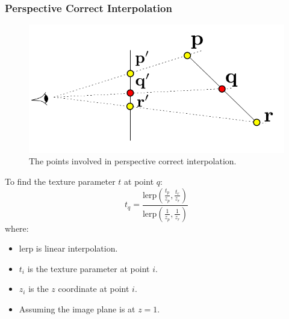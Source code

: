 \documentclass[11pt]{article}
\begin{document}
\subsubsection{Perspective Correct Interpolation}
\begin{figure}[htb!]
  \centering
  \caption{The points involved in perspective correct interpolation.}
  \includegraphics[scale=0.3]{perspectivecorrect}
\end{figure}
To find the texture parameter $t$ at point $q$:
\[
  t_q = \frac{\text{lerp}\left(\frac{t_p}{z_p}, \frac{t_r}{z_r} \right)} {\text{lerp}\left(\frac{1}{z_p}, \frac{1}{z_r} \right)}
\]
where:
\begin{itemize}
  \item $\text{lerp}$ is linear interpolation.
  \item $t_i$ is the texture parameter at point $i$.
  \item $z_i$ is the $z$ coordinate at point $i$.
  \item Assuming the image plane is at $z = 1$.
\end{itemize}
\end{document}
